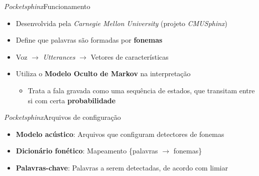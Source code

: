\begin{frame}{\textit{Pocketsphinx}}{Funcionamento}

\begin{itemize}
\item Desenvolvida pela \textit{Carnegie Mellon University} (projeto \textit{CMUSphinx})

\item Define que palavras são formadas por \textbf{fonemas}

\item<2-> Voz $\rightarrow$ \textit{Utterances} $\rightarrow$ Vetores de características

\item<3-> Utiliza o \textbf{Modelo Oculto de Markov} na interpretação

\begin{itemize}
  \item Trata a fala gravada como uma sequência de estados, que transitam entre si com certa \textbf{probabilidade}
\end{itemize}
\end{itemize}


\end{frame}


\begin{frame}{\textit{Pocketsphinx}}{Arquivos de configuração}

\begin{itemize}
\item \textbf{Modelo acústico}: Arquivos que configuram detectores de fonemas

\item<2-> \textbf{Dicionário fonético}: Mapeamento \{palavras \(\rightarrow\) fonemas\}
\end{itemize}


\begin{itemize}
\item<3-> \textbf{Palavras-chave}: Palavras a serem detectadas, de acordo com limiar
\end{itemize}

\end{frame}

